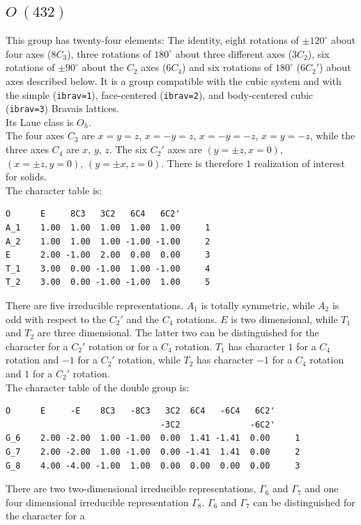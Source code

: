 \documentclass[12pt,a4paper]{article}
\begin{document}
\subsection{\color{web-blue}$O\ (432)$} 
This group has twenty-four elements: The identity, eight rotations 
of $\pm120^\circ$ about four axes ($8C_3$), three rotations of 
$180^\circ$ about three different axes ($3C_2$), six
rotations of $\pm90^\circ$ about the $C_2$ axes ($6C_4$) and
six rotations of $180^\circ$ ($6C_2'$) about axes described below.
It is a group compatible with the cubic system and with the  
simple (\texttt{ibrav=1}), face-centered (\texttt{ibrav=2}), 
and body-centered cubic (\texttt{ibrav=3}) Bravais lattices. \\
Its Laue class is $O_{h}$. \\
The four axes $C_3$ are $x=y=z$, $x=-y=z$, $x=-y=-z$, $x=y=-z$, while
the three axes $C_4$ are $x$, $y$, $z$. 
The six $C_2'$ axes are $(y=\pm z, x=0)$, $(x=\pm z, y=0)$, $(y=\pm x, z=0)$.
There is therefore $1$ realization of interest for solids. \\
The character table is:
\begin{verbatim}
O      E     8C3   3C2   6C4   6C2' 
A_1    1.00  1.00  1.00  1.00  1.00     1
A_2    1.00  1.00  1.00 -1.00 -1.00     2
E      2.00 -1.00  2.00  0.00  0.00     3
T_1    3.00  0.00 -1.00  1.00 -1.00     4
T_2    3.00  0.00 -1.00 -1.00  1.00     5
\end{verbatim}
There are five irreducible representations. $A_1$ is totally symmetric,
while $A_2$ is odd with respect to the $C_2'$ and the $C_4$ rotations.
$E$ is two dimensional, while $T_1$ and $T_2$ are three dimensional. The
latter two can be distinguished for the character for a $C_2'$ rotation
or for a $C_4$ rotation. $T_1$ has character $1$ for a $C_4$ rotation and
$-1$ for a $C_2'$ rotation, while $T_2$ has character $-1$ for a $C_4$ rotation
and $1$ for a $C_2'$ rotation. \\
The character table of the double group is:
\begin{verbatim}
O      E     -E    8C3   -8C3   3C2  6C4   -6C4   6C2'
                               -3C2              -6C2'
G_6    2.00 -2.00  1.00 -1.00  0.00  1.41 -1.41  0.00     1
G_7    2.00 -2.00  1.00 -1.00  0.00 -1.41  1.41  0.00     2
G_8    4.00 -4.00 -1.00  1.00  0.00  0.00  0.00  0.00     3
\end{verbatim}
There are two two-dimensional irreducible representations, $\Gamma_6$ and
$\Gamma_7$ and one four dimensional irreducible representation $\Gamma_8$.
$\Gamma_6$ and $\Gamma_7$ can be distinguished for the character for a
\end{document}
